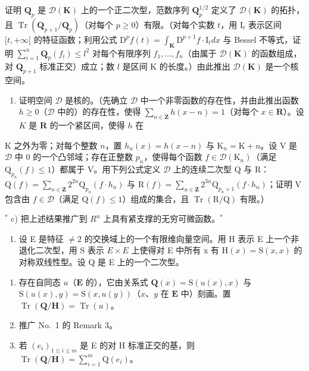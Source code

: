 证明 \(\mathbf{Q}_p\) 是 \(\mathcal{D}(\mathbf{K})\) 上的一个正二次型，范数序列 \(\mathbf{Q}_p^{1/2}\) 定义了 \(\mathcal{D}(\mathbf{K})\) 的拓扑，且 \(\operatorname{Tr}(\mathbf{Q}_{p+1}/\mathbf{Q}_p)\)（对每个 \(p \geqslant 0\)）有限。（对每个实数 \(t\)，用 \(\mathrm{I}_t\) 表示区间 \([t, +\infty[\) 的特征函数；利用公式 \(\mathrm{D}^p f(t) = \int_{\mathbf{K}} \mathrm{D}^{p+1} f \cdot \mathrm{I}_t dx\) 与 Bessel 不等式，证明 \(\sum_{i=1}^{n} \mathbf{Q}_p(f_i) \leqslant l^2\) 对每个有限序列 \(f_1, \ldots, f_n\)（由属于 \(\mathcal{D}(\mathbf{K})\) 的函数组成，对 \(\mathbf{Q}_{p+1}\) 标准正交）成立；数 \(l\) 是区间 K 的长度。）由此推出 \(\mathcal{D}(\mathbf{K})\) 是一个核空间。

\begin{enumerate}
\def\labelenumi{\alph{enumi})}
\setcounter{enumi}{1}
\tightlist
\item
  证明空间 \(\mathcal{D}\) 是核的。（先确立 \(\mathcal{D}\) 中一个非零函数的存在性，并由此推出函数 \(h \geqslant 0\)（\(\mathcal{D}\) 中的）的存在性，使得 \(\sum_{n \in \mathbf{Z}} h(x - n) = 1\)（对每个 \(x \in \mathbf{R}\)）。设 \(K\) 是 \(\mathbf{R}\) 的一个紧区间，使得 \(h\) 在
\end{enumerate}

K 之外为零；对每个整数 \(n\)，置 \(h_n(x) = h(x - n)\) 与 \(\mathrm{K}_n = \mathrm{K} + n\)。设 V 是 \(\mathcal{D}\) 中 0 的一个凸邻域；存在正整数 \(p_n\)，使得每个函数 \(f \in \mathcal{D}(\mathrm{K}_n)\)（满足 \(\mathrm{Q}_{p_n}(f) \leqslant 1\)）都属于 V。用下列公式定义 \(\mathcal{D}\) 上的连续二次型 Q 与 R：\(\mathrm{Q}(f) = \sum_{n \in \mathbf{Z}} 2^{2n} \mathrm{Q}_{p_n}(f \cdot h_n)\) 与 \(\mathrm{R}(f) = \sum_{n \in \mathbf{Z}} 2^{3n} \mathrm{Q}_{p_n + 1}(f \cdot h_n)\)；证明 V 包含由 \(f \in \mathcal{D}\)（满足 \(\mathrm{Q}(f) \leqslant 1\)）组成的集合，且 \(\operatorname{Tr}(\mathrm{R}/\mathrm{Q})\) 有限。）

\(^{*}\) c) 把上述结果推广到 \(R^{n}\) 上具有紧支撑的无穷可微函数。\(^{*}\)


\begin{enumerate}
\def\labelenumi{\arabic{enumi})}
\tightlist
\item
  设 E 是特征 \(\neq 2\) 的交换域上的一个有限维向量空间。用 H 表示 E 上一个非退化二次型，用 S 表示 \(E \times E\) 上使得对 E 中所有 x 有 \(\mathrm{H}(x) = \mathrm{S}(x, x)\) 的对称双线性型。设 Q 是 E 上的一个二次型。
\end{enumerate}

\begin{enumerate}
\def\labelenumi{\alph{enumi})}
\item
  存在自同态 \(u\)（\(\mathbf{E}\) 的），它由关系式 \(\mathbf{Q}(x) = \mathrm{S}(u(x), x)\) 与 \(\mathrm{S}(u(x), y) = \mathrm{S}(x, u(y))\)（\(x\)、\(y\) 在 \(\mathbf{E}\) 中）刻画。置 \(\operatorname{Tr}(\mathbf{Q}/\mathbf{H}) = \operatorname{Tr}(u)\)。
\item
  推广 No.~1 的 Remark 3。
\item
  若 \((e_i)_{1\leqslant i\leqslant m}\) 是 E 的对 H 标准正交的基，则 \(\operatorname{Tr}(\mathbf{Q}/\mathbf{H}) = \sum_{i=1}^{m}\mathrm{Q}(e_i)\)。
\end{enumerate}


